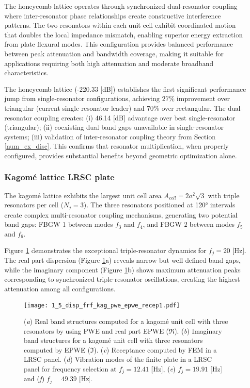 \documentclass[review,numbers,sort&compress]{elsarticle}
\begin{document}
{The honeycomb lattice operates through synchronized dual-resonator coupling where inter-resonator phase relationships create constructive interference patterns. The two resonators within each unit cell exhibit coordinated motion that doubles the local impedance mismatch, enabling superior energy extraction from plate flexural modes. This configuration provides balanced performance between peak attenuation and bandwidth coverage, making it suitable for applications requiring both high attenuation and moderate broadband characteristics.

The honeycomb lattice (-220.33 [dB]) establishes the first significant performance jump from single-resonator configurations, achieving $27\%$ improvement over triangular (current single-resonator leader) and $70\%$ over rectangular. The dual-resonator coupling creates: (i) 46.14 [dB] advantage over best single-resonator (triangular); (ii) coexisting dual band gaps unavailable in single-resonator systems; (iii) validation of inter-resonator coupling theory from Section \ref{num_ex_disc}. This confirms that resonator multiplication, when properly configured, provides substantial benefits beyond geometric optimization alone.

\subsubsection{Kagomé lattice LRSC plate}\label{panel_lat_k}

The kagomé lattice exhibits the largest unit cell area $A_{cell} = 2a^2\sqrt{3}$ with triple resonators per cell ($N_j = 3$). The three resonators positioned at 120° intervals create complex multi-resonator coupling mechanisms, generating two potential band gaps: FBGW 1 between modes $f_3$ and $f_4$, and FBGW 2 between modes $f_5$ and $f_6$.

Figure \ref{lat_k_pwe_epwe_tr_frf} demonstrates the exceptional triple-resonator dynamics for $f_j = 20$ [Hz]. The real part dispersion (Figure \ref{lat_k_pwe_epwe_tr_frf}a) reveals narrow but well-defined band gaps, while the imaginary component (Figure \ref{lat_k_pwe_epwe_tr_frf}b) shows maximum attenuation peaks corresponding to synchronized triple-resonator oscillations, creating the highest attenuation among all configurations.

\begin{figure}[htb]
	\centering
	\texttt{[image: 1\_5\_disp\_frf\_kag\_pwe\_epwe\_recep1.pdf]}
	\caption{(\textit{a}) Real band structures computed for a kagomé unit cell with three resonators by using PWE and real part EPWE ($\Re$). (\textit{b}) Imaginary band structures for a kagomé unit cell with three resonators computed by EPWE ($\Im$). (\textit{c}) Receptance computed by FEM in a LRSC panel. (\textit{d}) Vibration modes of the finite plate in a LRSC panel for frequency selection at $f_j = 12.41$ [Hz], (\textit{e}) $f_j = 19.91$ [Hz] and (\textit{f}) $f_j = 49.39$ [Hz].}
	\label{lat_k_pwe_epwe_tr_frf}
\end{figure}

}
\end{document}
